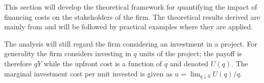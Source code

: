 \documentclass[../main.tex]{subfiles}
\begin{document}
    This section will develop the theoretical framework for quantifying the impact of financing costs on the stakeholders of the firm.
    The theoretical results derived are mainly from \cite{ADS2019} and will be followed by practical examples where they are applied.


    The analysis will still regard the firm considering an investment in a project.
    For generality the firm considers investing in $q$ units of the project; 
    the payoff is therefore $qY$ while the upfront cost is a function of $q$ and denoted $U(q)$. 
    The marginal investment cost per unit invested is given as 
    $u = \lim_{q\downarrow 0} U(q) / q$.
\end{document}
